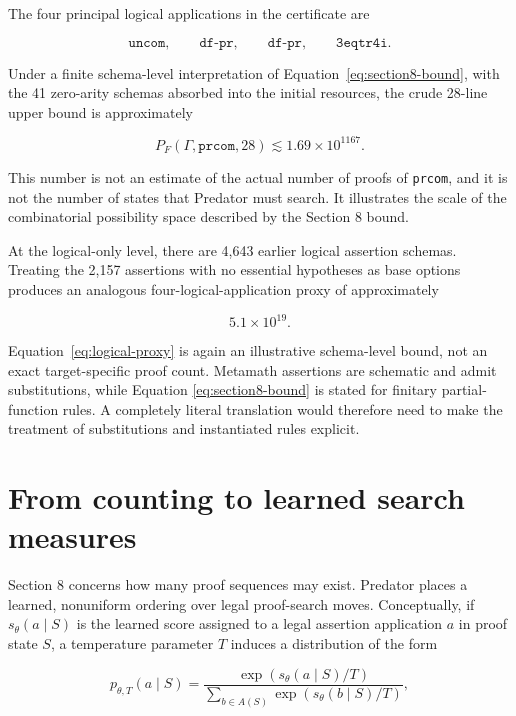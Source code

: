 \documentclass[11pt]{article}
\newcommand{\prcom}{\texttt{prcom}}
\begin{document}
The four principal logical applications in the certificate are

\[
\texttt{uncom},\qquad
\texttt{df-pr},\qquad
\texttt{df-pr},\qquad
\texttt{3eqtr4i}.
\]

Under a finite schema-level interpretation of
Equation~\eqref{eq:section8-bound}, with the 41 zero-arity schemas
absorbed into the initial resources, the crude 28-line upper bound is
approximately

\begin{equation}
P_F(\Gamma,\prcom,28)
\lesssim 1.69\times 10^{1167}.
\label{eq:raw-proxy}
\end{equation}

This number is not an estimate of the actual number of proofs of
\prcom, and it is not the number of states that Predator must search.
It illustrates the scale of the combinatorial possibility space
described by the Section 8 bound.

At the logical-only level, there are 4,643 earlier logical assertion
schemas.  Treating the 2,157 assertions with no essential hypotheses
as base options produces an analogous four-logical-application proxy
of approximately

\begin{equation}
5.1\times 10^{19}.
\label{eq:logical-proxy}
\end{equation}

Equation~\eqref{eq:logical-proxy} is again an illustrative schema-level
bound, not an exact target-specific proof count.  Metamath assertions
are schematic and admit substitutions, while Equation
\eqref{eq:section8-bound} is stated for finitary partial-function
rules.  A completely literal translation would therefore need to
make the treatment of substitutions and instantiated rules explicit.

\section{From counting to learned search measures}

Section 8 concerns how many proof sequences may exist.  Predator
places a learned, nonuniform ordering over legal proof-search moves.
Conceptually, if $s_\theta(a\mid S)$ is the learned score assigned to
a legal assertion application $a$ in proof state $S$, a temperature
parameter $T$ induces a distribution of the form

\begin{equation}
p_{\theta,T}(a\mid S)
=
\frac{\exp\!\left(s_\theta(a\mid S)/T\right)}
{\displaystyle\sum_{b\in A(S)}
 \exp\!\left(s_\theta(b\mid S)/T\right)},
\label{eq:policy}
\end{equation}
\end{document}
